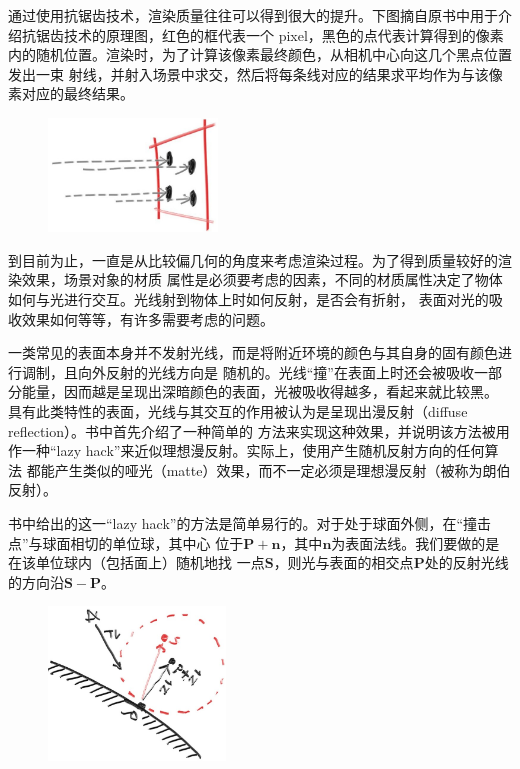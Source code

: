 \documentclass[12pt]{article}
\begin{document}
\indent{}通过使用抗锯齿技术，渲染质量往往可以得到很大的提升。下图摘自原书中用于介绍抗锯齿技术的原理图，红色的框代表一个
pixel，黑色的点代表计算得到的像素内的随机位置。渲染时，为了计算该像素最终颜色，从相机中心向这几个黑点位置发出一束
射线，并射入场景中求交，然后将每条线对应的结果求平均作为与该像素对应的最终结果。
\begin{figure}[h]
\centering
\includegraphics[width=0.4\textwidth]{./imgs/fig-1.07-pixel-samples.jpg}
\end{figure}

\indent{}到目前为止，一直是从比较偏几何的角度来考虑渲染过程。为了得到质量较好的渲染效果，场景对象的材质
属性是必须要考虑的因素，不同的材质属性决定了物体如何与光进行交互。光线射到物体上时如何反射，是否会有折射，
表面对光的吸收效果如何等等，有许多需要考虑的问题。

\indent{}一类常见的表面本身并不发射光线，而是将附近环境的颜色与其自身的固有颜色进行调制，且向外反射的光线方向是
随机的。光线“撞”在表面上时还会被吸收一部分能量，因而越是呈现出深暗颜色的表面，光被吸收得越多，看起来就比较黑。
具有此类特性的表面，光线与其交互的作用被认为是呈现出漫反射（diffuse reflection）。书中首先介绍了一种简单的
方法来实现这种效果，并说明该方法被用作一种“lazy hack”来近似理想漫反射。实际上，使用产生随机反射方向的任何算法
都能产生类似的哑光（matte）效果，而不一定必须是理想漫反射（被称为朗伯反射）。

\indent{}书中给出的这一“lazy hack”的方法是简单易行的。对于处于球面外侧，在“撞击点”与球面相切的单位球，其中心
位于$\mathbf{P}+\mathbf{n}$，其中$\mathbf{n}$为表面法线。我们要做的是在该单位球内（包括面上）随机地找
一点$\mathbf{S}$，则光与表面的相交点$\mathbf{P}$处的反射光线的方向沿$\mathbf{S}-\mathbf{P}$。
\begin{figure}[h]
\centering
\includegraphics[width=0.42\textwidth]{./imgs/fig-1.09-rand-vec.jpg}
\end{figure}
\end{document}
